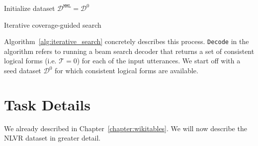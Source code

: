 \begin{algorithm} \SetAlgoLined {}
	   Initialize dataset
	$\mathcal{D}^{\texttt{MML}} = \mathcal{D}^0$\;
\caption{Iterative coverage-guided search} \label{alg:iterative_search}
\end{algorithm}

Algorithm~\ref{alg:iterative_search} concretely describes this process.
\texttt{Decode} in the algorithm refers to running a beam search decoder that
returns a set of consistent logical forms (i.e. $\mathcal{T} = 0$) for each of
the input utterances. We start off with a seed dataset $\mathcal{D}^0$ for
which consistent logical forms are available.

\section{Task Details} \label{sec:datasets}
We already described \WTQ{} in
Chapter~\ref{chapter:wikitables}.
We will now describe the NLVR dataset in greater detail.

